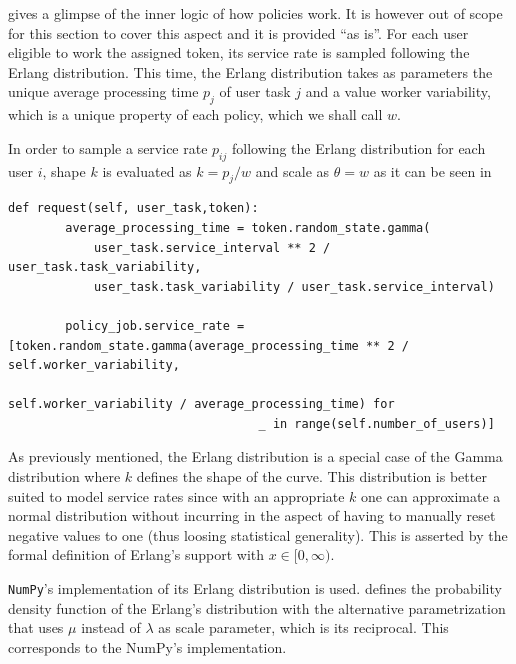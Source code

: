 \documentclass{seal_thesis}
\begin{document}
 gives a glimpse of the inner logic of how policies work. It is however out of scope for this section to cover this aspect and it is provided ``as is''. For each user eligible to work the assigned token, its service rate is sampled following the Erlang distribution. This time, the Erlang distribution takes as parameters the unique average processing time $p_j$ of user task $j$ and a value worker variability, which is a unique property of each policy, which we shall call $w$.

In order to sample a service rate $p_{ij}$ following the Erlang distribution for each user $i$, shape $k$ is evaluated as $k=p_j/w$ and scale as $\theta = w$ as it can be seen in 



\begin{lstlisting}[caption=User service rate sampling following an Erlang distribution,label=lst:user_service_rate,style=CustomPython]
    def request(self, user_task,token):
        average_processing_time = token.random_state.gamma(
            user_task.service_interval ** 2 / user_task.task_variability,
            user_task.task_variability / user_task.service_interval)

        policy_job.service_rate = [token.random_state.gamma(average_processing_time ** 2 / self.worker_variability,
                                                           self.worker_variability / average_processing_time) for
                                   _ in range(self.number_of_users)]
\end{lstlisting}

As previously mentioned, the Erlang distribution is a special case of the Gamma distribution where $k$ defines the shape of the curve. This distribution is better suited to model service rates since with an appropriate $k$ one can approximate a normal distribution without incurring in the aspect of having to manually reset negative values to one (thus loosing statistical generality). This is asserted by the formal definition of Erlang's support with $x \in [0,\infty)$.

\texttt{NumPy}'s implementation of its Erlang distribution is used.  defines the probability density function of the Erlang's distribution with the alternative parametrization that uses $\mu$ instead of $\lambda$ as scale parameter, which is its reciprocal. This corresponds to the NumPy's implementation.
\end{document}
